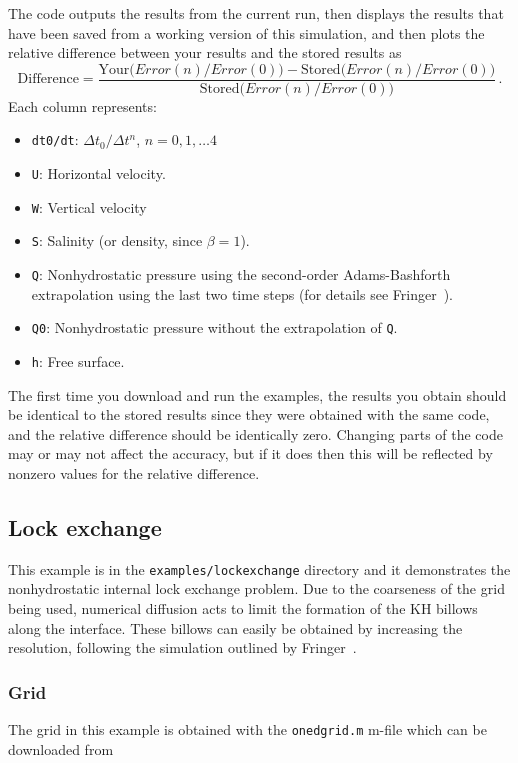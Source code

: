 The code outputs the results from the current run, then displays the results that
have been saved from a working version of this simulation, and then plots the relative
difference between your results and the stored results as
\[
\mbox{Difference} = \frac{\mbox{Your($Error(n)/Error(0)$)} - \mbox{Stored($Error(n)/Error(0)$)}}
{\mbox{Stored($Error(n)/Error(0)$)}}\,.
\]
Each column represents:
\begin{itemize}
\item \verb+dt0/dt+: $\Delta t_0/\Delta t^n$, $n=0,1,\dots 4$
\item \verb+U+: Horizontal velocity.
\item \verb+W+: Vertical velocity
\item \verb+S+: Salinity (or density, since $\beta=1$).
\item \verb+Q+: Nonhydrostatic pressure using the second-order Adams-Bashforth extrapolation
using the last two time steps (for details see Fringer\etal~\cite{FRINGER[2005]}).
\item \verb+Q0+: Nonhydrostatic pressure without the extrapolation of \verb+Q+.
\item \verb+h+: Free surface.
\end{itemize}
The first time you download and run the examples, the results
you obtain should be identical to the stored results since they were obtained with the
same code, and the relative difference should be identically zero.  Changing parts of the
code may or may not affect the accuracy, but if it does then this will be reflected by
nonzero values for the relative difference.

\subsection{Lock exchange} \label{sec:lockexchange}

This example is in the \verb+examples/lockexchange+ directory and it 
demonstrates the nonhydrostatic internal lock exchange problem.  Due to the
coarseness of the grid being used, numerical diffusion acts to limit the formation of
the KH billows along the interface.  These billows can easily be obtained by increasing
the resolution, following the simulation outlined by Fringer\etal~\cite{FRINGER[2005]}.

\subsubsection{Grid}

The grid in this example is obtained with the 
\verb+onedgrid.m+ m-file which can be downloaded from 

